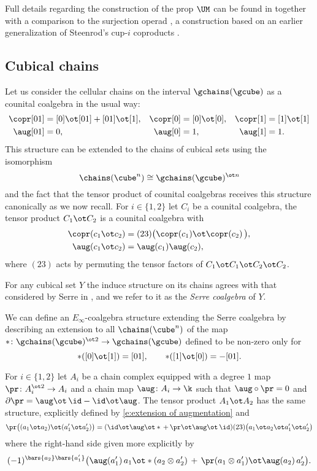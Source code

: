 Full details regarding the construction of the prop $\UM$ can be found in \cite{medina2020prop1} together with a comparison to the surjection operad \cite{mcclure2003multivariable, berger2004combinatorial}, a construction based on an earlier generalization of Steenrod's cup-$i$ coproducts \cite[\S4.5]{benson1998representations}.

\subsection{Cubical chains}

Let us consider the cellular chains on the interval $\gchains(\gcube)$ as a counital coalgebra in the usual way:
\begin{align*}
\copr[01] &= [0] \ot [01] + [01] \ot [1], &
\copr[0]  &= [0] \ot [0], &
\copr[1]  &= [1] \ot [1] \\
\aug[01] &= 0, &
\aug[0]  &= 1, &
\aug [1]  &= 1.
\end{align*}
This structure can be extended to the chains of cubical sets using the isomorphism
\[
\chains(\cube^n) \cong \gchains(\gcube)^{\ot n}
\]
and the fact that the tensor product of counital coalgebras receives this structure canonically as we now recall.
For $i \in \{1,2\}$ let $C_i$ be a counital coalgebra, the tensor product $C_1 \ot C_2$ is a counital coalgebra with
\begin{align} \label{e:extension of coproduct}
\copr(c_1 \ot c_2) &= (23) \big( \copr(c_1) \ot \copr(c_2) \, \big), \\
\label{e:extension of augmentation}
\aug(c_1 \ot c_2) &= \aug(c_1) \aug(c_2),
\end{align}
where $(23)$ acts by permuting the tensor factors of $C_1 \ot C_1 \ot C_2 \ot C_2$.

For any cubical set $Y$ the induce structure on its chains agrees with that considered by Serre in \cite{serre1951homologie}, and we refer to it as the \textit{Serre coalgebra} of $Y$.

We can define an $E_\infty$-coalgebra structure extending the Serre coalgebra by describing an extension to all $\chains(\cube^n)$ of the map $\ast \colon \gchains(\gcube)^{\ot 2} \to \gchains(\gcube)$ defined to be non-zero only for
\[
\ast([0] \ot [1]) = [01], \qquad
\ast([1] \ot [0]) = - [01].
\]

For $i \in \{1,2\}$ let $A_i$ be a chain complex equipped with a degree $1$ map $\pr \colon A_i^{\ot 2} \to A_i$ and a chain map $\aug \colon A_i \to \k$ such that $\aug \circ \pr = 0$ and $\partial \pr = \aug \ot \, \id - \id \ot \aug$.
The tensor product $A_1 \ot A_2$ has the same structure, explicitly defined by \eqref{e:extension of augmentation} and
\begin{equation} \label{e:extension of product}
\pr \big( (a_1 \ot a_2) \ot (a_1^\prime \ot a_2^\prime)\big) =
(\id \ot \aug \ot \ast \, + \, \pr \ot \aug \ot \, \id)(23)
\big( a_1 \ot a_2 \ot a_1^\prime \ot a_2^\prime \big)
\end{equation}
where the right-hand side given more explicitly by
\[
(-1)^{\bars{a_2} \bars{a_1^\prime}} \big( \aug(a_1^\prime) \, a_1 \ot \ast (a_2 \otimes a_2^\prime)  \, + \, \pr(a_1 \otimes a_1^\prime) \ot \aug(a_2) \, a_2^\prime \big).
\]

